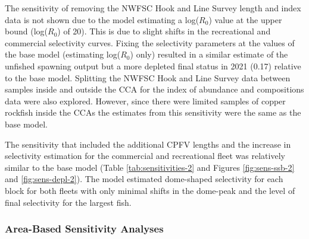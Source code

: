 \documentclass[11pt,
  english,
  a4paper,
]{article}
\begin{document}
The sensitivity of removing the NWFSC Hook and Line Survey length and index data is not shown due to the model estimating a log({\(R_0\)\leavevmode\tagmcend\tagstructend}) value at the upper bound (log({\(R_0\)\leavevmode\tagmcend\tagstructend}) of 20). This is due to slight shifts in the recreational and commercial selectivity curves. Fixing the selectivity parameters at the values of the base model (estimating log({\(R_0\)\leavevmode\tagmcend\tagstructend}) only) resulted in a similar estimate of the unfished spawning output but a more depleted final status in 2021 (0.17) relative to the base model. Splitting the NWFSC Hook and Line Survey data between samples inside and outside the CCA for the index of abundance and compositions data were also explored. However, since there were limited samples of copper rockfish inside the CCAs the estimates from this sensitivity were the same as the base model.

\leavevmode\tagmcend\tagstructend\par


The sensitivity that included the additional CPFV lengths and the increase in selectivity estimation for the commercial and recreational fleet was relatively similar to the base model (Table \ref{tab:sensitivities-2} and Figures \ref{fig:sens-ssb-2} and \ref{fig:sens-depl-2}). The model estimated dome-shaped selectivity for each block for both fleets with only minimal shifts in the dome-peak and the level of final selectivity for the largest fish.

\leavevmode\tagmcend\tagstructend\par


\hypertarget{area-based-sensitivity-analyses}{%
\subsubsection{Area-Based Sensitivity Analyses}\label{area-based-sensitivity-analyses}}

\leavevmode\tagmcend\tagstructend

\end{document}
